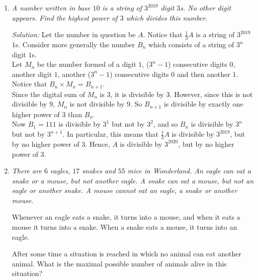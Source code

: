 \documentclass{article}
\begin{document}
\begin{enumerate}[1.]
\vspace{6.81mm}

\item %
{\itshape
A number written in base $10$ is a string of $3^{2019}$ digit $3$s.
No other digit appears.
Find the highest power of $3$ which divides this number.}

\textit{Solution:}
Let the number in question be $A$. Notice that $\frac{1}{3}A$ is a string of $3^{2019}$ $1$s. Consider more generally the number $B_n$ which consists of a string of $3^n$ digit $1$s.\\
Let $M_n$ be the number formed of a digit $1$, ($3^n - 1$) consecutive digits $0$, another digit $1$, another ($3^n - 1$) consecutive digits $0$ and then another $1$.
Notice that $B_n \times M_n = B_{n + 1}$.\\
Since the digital sum of $M_n$ is $3$, it is divisible by $3$. However, since this is not divisible by $9$, $M_n$ is not divisible by $9$. So $B_{n + 1}$ is divisible by exactly one higher power of $3$ than $B_n$.\\
Now $B_1 = 111$ is divisible by $3^1$ but not by $3^2$, and so $B_n$ is divisible by $3^n$ but not by $3^{n + 1}$. In particular, this means that $\frac{1}{3}A$ is divisible by $3^{2019}$, but by no higher power of $3$. Hence, $A$ is divisible by $3^{2020}$, but by no higher power of $3$.

\vspace{6.81mm}

\item %
{\itshape
There are $6$ eagles, $17$ snakes and $55$ mice in Wonderland.
An eagle can eat a snake or a mouse, but not another eagle.
A snake can eat a mouse, but not an eagle or another snake.
A mouse cannot eat an eagle, a snake or another mouse.

Whenever an eagle eats a snake, it turns into a mouse, and when it eats a mouse it turns into a snake. When a snake eats a mouse, it turns into an eagle.

After some time a situation is reached in which no animal can eat another animal.
What is the maximal possible number of animals alive in this situation?}


\end{enumerate}
\end{document}
